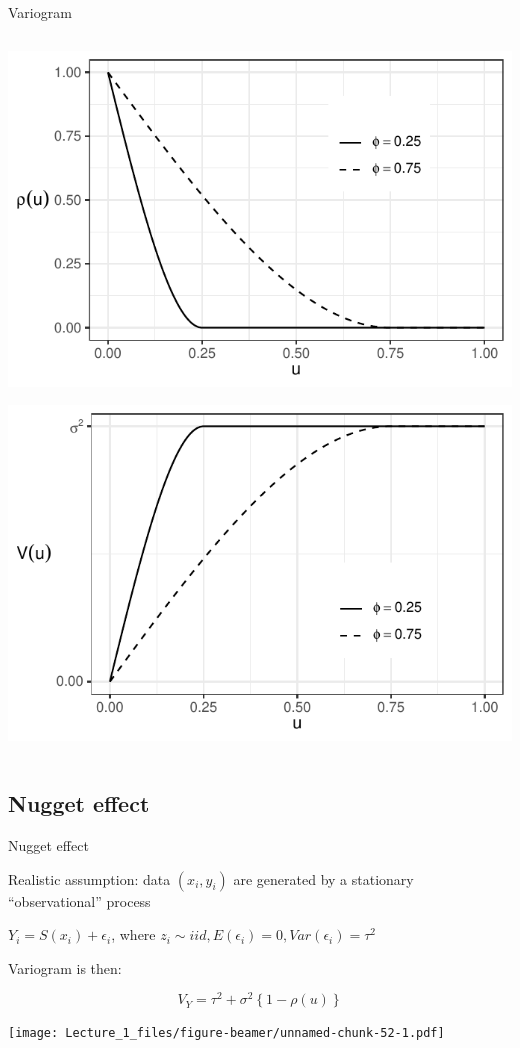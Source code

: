 \documentclass[
  ignorenonframetext,
]{beamer}
\begin{document}
\begin{frame}{Variogram}
\begin{columns}[T]
\begin{column}{0.48\textwidth}
\includegraphics{Lecture_1_files/figure-beamer/unnamed-chunk-50-1.pdf}

\includegraphics{Lecture_1_files/figure-beamer/unnamed-chunk-51-1.pdf}
\end{column}
\end{columns}
\end{frame}

\hypertarget{nugget-effect}{%
\subsection{Nugget effect}\label{nugget-effect}}

\begin{frame}{Nugget effect}
\small

Realistic assumption: data \((x_i,y_i)\) are generated by a stationary
``observational'' process

\(Y_i=S(x_i)+\epsilon_i\), where
\(z_i\sim iid, E(\epsilon_i)=0, Var(\epsilon_i)=\tau^2\)

Variogram is then:

\[V_Y=\tau^2+\sigma^2\left\{1-\rho(u)\right\}\]

\texttt{[image: Lecture\_1\_files/figure-beamer/unnamed-chunk-52-1.pdf]}
\end{frame}
\end{document}
